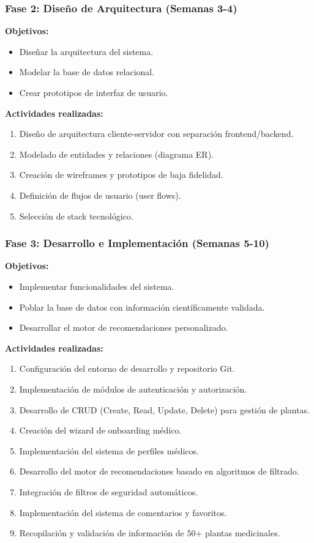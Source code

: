 \documentclass[12pt,a4paper]{article}
\begin{document}
\subsubsection{Fase 2: Diseño de Arquitectura (Semanas 3-4)}

\textbf{Objetivos:}
\begin{itemize}
    \item Diseñar la arquitectura del sistema.
    \item Modelar la base de datos relacional.
    \item Crear prototipos de interfaz de usuario.
\end{itemize}

\textbf{Actividades realizadas:}
\begin{enumerate}
    \item Diseño de arquitectura cliente-servidor con separación frontend/backend.
    \item Modelado de entidades y relaciones (diagrama ER).
    \item Creación de wireframes y prototipos de baja fidelidad.
    \item Definición de flujos de usuario (user flows).
    \item Selección de stack tecnológico.
\end{enumerate}

\subsubsection{Fase 3: Desarrollo e Implementación (Semanas 5-10)}

\textbf{Objetivos:}
\begin{itemize}
    \item Implementar funcionalidades del sistema.
    \item Poblar la base de datos con información científicamente validada.
    \item Desarrollar el motor de recomendaciones personalizado.
\end{itemize}

\textbf{Actividades realizadas:}
\begin{enumerate}
    \item Configuración del entorno de desarrollo y repositorio Git.
    \item Implementación de módulos de autenticación y autorización.
    \item Desarrollo de CRUD (Create, Read, Update, Delete) para gestión de plantas.
    \item Creación del wizard de onboarding médico.
    \item Implementación del sistema de perfiles médicos.
    \item Desarrollo del motor de recomendaciones basado en algoritmos de filtrado.
    \item Integración de filtros de seguridad automáticos.
    \item Implementación del sistema de comentarios y favoritos.
    \item Recopilación y validación de información de 50+ plantas medicinales.
\end{enumerate}
\end{document}
